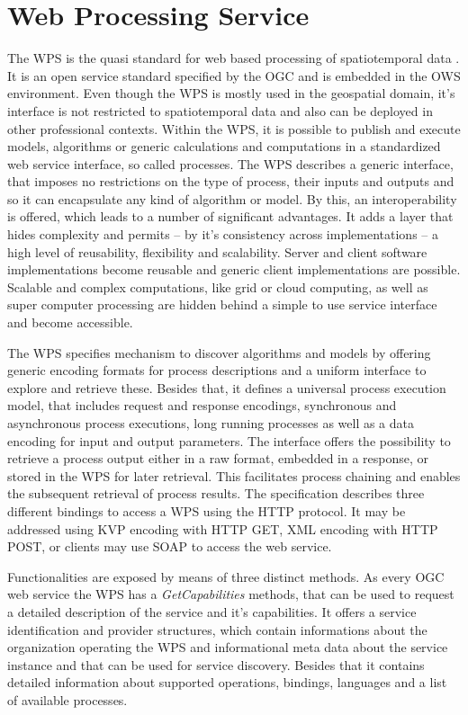\section{Web Processing Service}
	\label{sec:wps}
	The \ac{WPS} \citep{ogc:wps} is the quasi standard for web based processing of spatiotemporal data \citep{foerster2012live}. It is an open service standard specified by the \ac{OGC} and is embedded in the \ac{OWS} environment. Even though the \ac{WPS} is mostly used in the geospatial domain, it's interface is not restricted to spatiotemporal data and also can be deployed in other professional contexts. Within the WPS, it is possible to publish and execute models, algorithms or generic calculations and computations in a standardized web service interface, so called processes. The \ac{WPS} describes a generic interface, that imposes no restrictions on the type of process, their inputs and outputs and so it can encapsulate any kind of algorithm or model. By this, an interoperability is offered, which leads to a number of significant advantages. It adds a layer that hides complexity and permits -- by it's consistency across implementations -- a high level of reusability, flexibility and scalability. Server and client software implementations become reusable and generic client implementations are possible. Scalable and complex computations, like grid or cloud computing, as well as super computer processing are hidden behind a simple to use service interface and become accessible.

	The \ac{WPS} specifies mechanism to discover algorithms and models by offering generic encoding formats for process descriptions and a uniform interface to explore and retrieve these. Besides that, it defines a universal process execution model, that includes request and response encodings, synchronous and asynchronous process executions, long running processes as well as a data encoding for input and output parameters. The interface offers the possibility to retrieve a process output either in a raw format, embedded in a response, or stored in the \ac{WPS} for later retrieval. This facilitates process chaining and enables the subsequent retrieval of process results. The specification describes three different bindings to access a \ac{WPS} using the HTTP protocol. It may be addressed using \ac{KVP} encoding with HTTP GET, XML encoding with HTTP POST, or clients may use SOAP \citep{w3c:soap1} to access the web service.

	Functionalities are exposed by means of three distinct methods. As every \ac{OGC} web service the \ac{WPS} has a \emph{GetCapabilities} methods, that can be used to request a detailed description of the service and it's capabilities. It offers a service identification and provider structures, which contain informations about the organization operating the \ac{WPS} and informational meta data about the service instance and that can be used for service discovery. Besides that it contains detailed information about supported operations, bindings, languages and a list of available processes.

